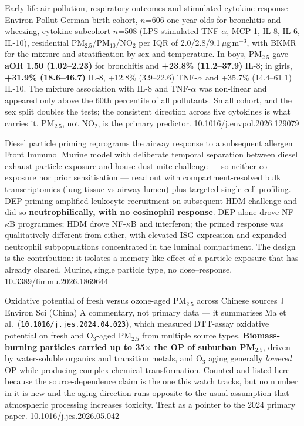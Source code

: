 \documentclass[10pt]{article}
\begin{document}
{Early-life air pollution, respiratory outcomes and stimulated cytokine response}
{Environ Pollut}
{German birth cohort, $n$=606 one-year-olds for bronchitis and wheezing, cytokine
subcohort $n$=508 (LPS-stimulated TNF-$\alpha$, MCP-1, IL-8, IL-6, IL-10), residential
PM$_{2.5}$/PM$_{10}$/NO$_2$ per IQR of 2.0/2.8/9.1\,$\mu$g\,m$^{-3}$, with BKMR for the
mixture and stratification by sex and temperature. In boys, PM$_{2.5}$ gave
\textbf{aOR 1.50 (1.02--2.23)} for bronchitis and \textbf{+23.8\% (11.2--37.9)} IL-8;
in girls, \textbf{+31.9\% (18.6--46.7)} IL-8, +12.8\% (3.9--22.6) TNF-$\alpha$ and
+35.7\% (14.4--61.1) IL-10. The mixture association with IL-8 and TNF-$\alpha$ was
non-linear and appeared only above the 60th percentile of all pollutants. Small cohort,
and the sex split doubles the tests; the consistent direction across five cytokines is
what carries it. PM$_{2.5}$, not NO$_2$, is the primary predictor.}
{10.1016/j.envpol.2026.129079}

\clearpage


{Diesel particle priming reprograms the airway response to a subsequent allergen}
{Front Immunol}
{Murine model with deliberate temporal separation between diesel exhaust particle
exposure and house dust mite challenge --- so neither co-exposure nor prior
sensitisation --- read out with compartment-resolved bulk transcriptomics (lung tissue
vs airway lumen) plus targeted single-cell profiling. DEP priming amplified leukocyte
recruitment on subsequent HDM challenge and did so \textbf{neutrophilically, with no
eosinophil response}. DEP alone drove NF-$\kappa$B programmes; HDM drove NF-$\kappa$B
and interferon; the primed response was qualitatively different from either, with
elevated ISG expression and expanded neutrophil subpopulations concentrated in the
luminal compartment. The design is the contribution: it isolates a memory-like effect of
a particle exposure that has already cleared. Murine, single particle type, no
dose--response.}
{10.3389/fimmu.2026.1869644}

{Oxidative potential of fresh versus ozone-aged PM$_{2.5}$ across Chinese sources}
{J Environ Sci (China)}
{A commentary, not primary data --- it summarises Ma et al.\ (\texttt{10.1016/j.jes.2024.04.023}),
which measured DTT-assay oxidative potential on fresh and O$_3$-aged
PM$_{2.5}$ from multiple source types. \textbf{Biomass-burning particles carried up to
35$\times$ the OP of suburban PM$_{2.5}$}, driven by water-soluble organics and
transition metals, and O$_3$ aging generally \emph{lowered} OP while producing complex
chemical transformation. Counted and listed here because the source-dependence claim is
the one this watch tracks, but no number in it is new and the aging direction runs
opposite to the usual assumption that atmospheric processing increases toxicity.
Treat as a pointer to the 2024 primary paper.}
{10.1016/j.jes.2026.05.042}
\end{document}
